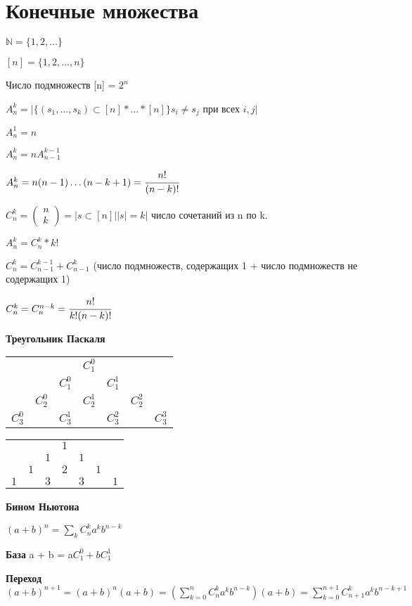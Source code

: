 \documentclass[12pt]{article}
\begin{document}
\section{Конечные множества}

$\mathbb N = \{1, 2, \ldots \}$

$[n] = \{1, 2, \ldots, n\}$

Число подмножеств [n] = $2^n$

$A^k_n = |\{(s_1, \ldots, s_k) \subset [n] * \ldots *[n]\} s_i \ne s_j$ при всех $i, j|$

$A^1_n = n$

$A^k_n = n A^{k - 1}_{n - 1}$

$A^k_n = n(n - 1)\ldots(n - k + 1) = \cfrac{n!}{(n - k)!}$

$C_n^k = \left(\begin{smallmatrix} n \\ k\end{smallmatrix}\right) = |{s \subset [n]| |s| = k}|$ число сочетаний из n по k.

$A_n^k = C_n^k * k!$

$C_n^k = C_{n - 1}^{k - 1} + C_{n - 1}^{k}$ (число подмножеств, содержащих 1 + число подмножеств не содержащих 1)

$C_n^k = C_n^{n - k} = \cfrac{n!}{k!(n - k)!}$

{\bf Треугольник Паскаля}

\begin{tabular}{c c c c c c c}
&&&$C_1^0$&&&\\
&&$C_1^0$&&$C_1^1$&&\\
&$C_2^0$&&$C_2^1$&&$C_2^2$&\\
$C_3^0$&&$C_3^1$&&$C_3^2$&&$C_3^3$\\
\end{tabular}

\begin{tabular}{c c c c c c c}
&&&$1$&&&\\
&&$1$&&$1$&&\\
&$1$&&$2$&&$1$&\\
$1$&&$3$&&$3$&&$1$\\
\end{tabular}

{\bf Бином Ньютона}

$(a + b)^n = \sum_k C_n^k a^k b^{n - k}$

{\bf База} a + b = a$C_1^0 + b C_1^1$ 

{\bf Переход} $(a + b)^{n + 1} = (a + b)^n(a + b) = (\sum_{k = 0}^{n} C_n^k a^k b^{n - k})(a + b) = \sum_{k = 0}^{n + 1} C_{n + 1}^{k} a^kb^{n - k + 1}$
\end{document}
